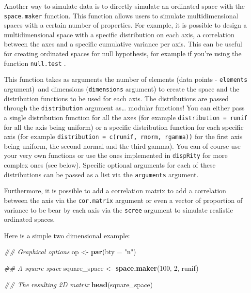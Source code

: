 \documentclass[]{book}
\newenvironment{Shaded}{\begin{snugshade}}{\end{snugshade}}
\newcommand{\CommentTok}[1]{\textcolor[rgb]{0.56,0.35,0.01}{\textit{#1}}}
\newcommand{\DataTypeTok}[1]{\textcolor[rgb]{0.13,0.29,0.53}{#1}}
\newcommand{\DecValTok}[1]{\textcolor[rgb]{0.00,0.00,0.81}{#1}}
\newcommand{\KeywordTok}[1]{\textcolor[rgb]{0.13,0.29,0.53}{\textbf{#1}}}
\newcommand{\NormalTok}[1]{#1}
\newcommand{\StringTok}[1]{\textcolor[rgb]{0.31,0.60,0.02}{#1}}
\begin{document}
Another way to simulate data is to directly simulate an ordinated space with the \texttt{space.maker} function.
This function allows users to simulate multidimensional spaces with a certain number of properties.
For example, it is possible to design a multidimensional space with a specific distribution on each axis, a correlation between the axes and a specific cumulative variance per axis.
This can be useful for creating ordinated spaces for null hypothesis, for example if you're using the function \texttt{null.test} \citep{diaz2016global}.

This function takes as arguments the number of elements (data points - \texttt{elements} argument)~and dimensions (\texttt{dimensions} argument) to create the space and the distribution functions to be used for each axis.
The distributions are passed through the \texttt{distribution} argument as\ldots{} modular functions!
You can either pass a single distribution function for all the axes (for example \texttt{distribution\ =\ runif} for all the axis being uniform) or a specific distribution function for each specific axis (for example \texttt{distribution\ =\ c(runif,\ rnorm,\ rgamma))} for the first axis being uniform, the second normal and the third gamma).
You can of course use your very own functions or use the ones implemented in \texttt{dispRity} for more complex ones (see below).
Specific optional arguments for each of these distributions can be passed as a list via the \texttt{arguments} argument.

Furthermore, it is possible to add a correlation matrix to add a correlation between the axis via the \texttt{cor.matrix} argument or even a vector of proportion of variance to be bear by each axis via the \texttt{scree} argument to simulate realistic ordinated spaces.

Here is a simple two dimensional example:

\begin{Shaded}
\begin{Highlighting}[]
\CommentTok{## Graphical options}
\NormalTok{op <-}\StringTok{ }\KeywordTok{par}\NormalTok{(}\DataTypeTok{bty =} \StringTok{"n"}\NormalTok{)}

\CommentTok{## A square space}
\NormalTok{square_space <-}\StringTok{ }\KeywordTok{space.maker}\NormalTok{(}\DecValTok{100}\NormalTok{, }\DecValTok{2}\NormalTok{, runif)}

\CommentTok{## The resulting 2D matrix}
\KeywordTok{head}\NormalTok{(square_space)}
\end{Highlighting}
\end{Shaded}
\end{document}
